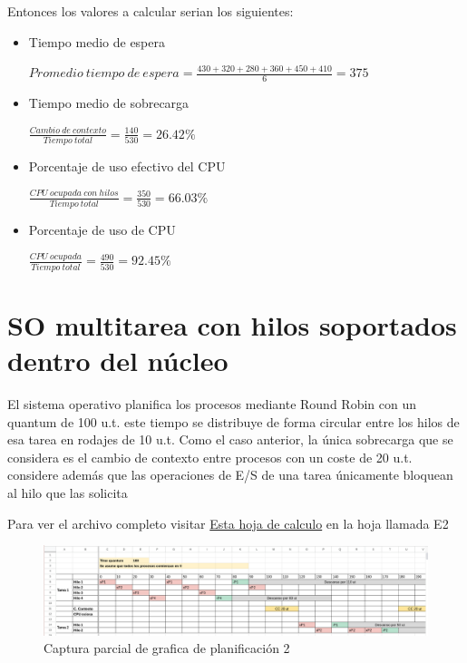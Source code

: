 \documentclass{article}
\begin{document}
Entonces los valores a calcular serian los siguientes:
\begin{itemize}
	\item Tiempo medio de espera
	\begin{center}
		$ Promedio\  tiempo\  de\  espera = \frac{430 + 320 + 280 + 360 + 450 + 410}{6} = 375 $
	\end{center}
	\item Tiempo medio de sobrecarga
	\begin{center}
		$ \frac{Cambio\  de\  contexto}{Tiempo\  total} = \frac{140}{530} = 26.42\% $
	\end{center}		
	\item Porcentaje de uso efectivo del CPU
	\begin{center}
		$ \frac{CPU \  ocupada\  con\  hilos}{Tiempo\  total} = \frac{350}{530} = 66.03\% $
	\end{center}
	\item Porcentaje de uso de CPU
	\begin{center}
		$ \frac{CPU \  ocupada}{Tiempo\  total} = \frac{490}{530} = 92.45\% $
	\end{center}
\end{itemize}

\section{SO multitarea con hilos soportados dentro del núcleo}
El sistema operativo
planifica los procesos mediante Round Robin con un quantum de 100 u.t. este tiempo se
distribuye de forma circular entre los hilos de esa tarea en rodajes de 10 u.t. Como el caso
anterior, la única sobrecarga que se considera es el cambio de contexto entre procesos con un
coste de 20 u.t. considere además que las operaciones de E/S de una tarea únicamente bloquean
al hilo que las solicita

Para ver el archivo completo visitar \href{https://docs.google.com/spreadsheets/d/1Rp1qp1uHB0s8WWKpClNhiJQQU-BFLd2jRRI6iWhH4GQ/edit?usp=sharing}{Esta hoja de calculo} 
en la hoja llamada E2 
\begin{figure}[h]
\caption{Captura parcial de grafica de planificación 2}
\centering
\includegraphics[scale=0.25,clip]{test2.png}
\end{figure}
\end{document}
